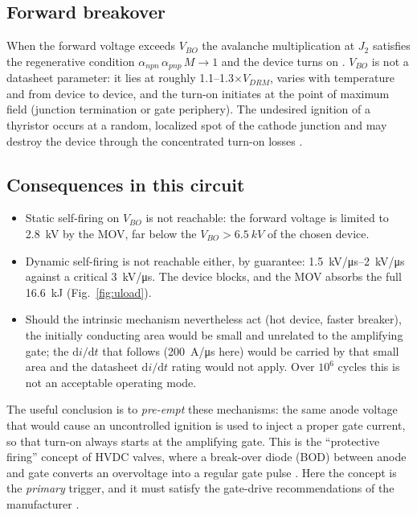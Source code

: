 \documentclass[11pt,a4paper]{article}
\begin{document}
\subsection{Forward breakover}

When the forward voltage exceeds $V_{BO}$ the avalanche multiplication at $J_2$ satisfies the
regenerative condition $\alpha_{npn}\,\alpha_{pnp}\,M \to 1$ and the device turns on
\cite{baliga}. $V_{BO}$ is not a datasheet parameter: it lies at roughly
\numrange{1.1}{1.3}$\times V_{DRM}$, varies with temperature and from device to device, and the
turn-on initiates at the point of maximum field (junction termination or gate periphery). The
undesired ignition of a thyristor occurs at a random, localized spot of the cathode
junction and may destroy the device through the concentrated turn-on losses \cite{bodpatent}.

\subsection{Consequences in this circuit}

\begin{itemize}
\item Static self-firing on $V_{BO}$ is not reachable: the forward voltage is limited to
      \SI{2.8}{kV} by the MOV, far below the $V_{BO} > \SI{6.5}{kV}$ of the chosen
      device.
\item Dynamic self-firing is not reachable either, by guarantee: \SIrange{1.5}{2}{kV/\micro s}
      against a critical \SI{3}{kV/\micro s}. The device blocks, and the MOV absorbs the full
      \SI{16.6}{kJ} (Fig.~\ref{fig:uload}).
\item Should the intrinsic mechanism nevertheless act (hot device, faster breaker), the
      initially conducting area would be small and unrelated to the amplifying gate; the
      $\mathrm{d}i/\mathrm{d}t$ that follows (\SI{200}{A/\micro s} here) would be carried by that
      small area and the datasheet $\mathrm{d}i/\mathrm{d}t$ rating would not apply. Over $10^6$
      cycles this is not an acceptable operating mode.
\end{itemize}

The useful conclusion is to \emph{pre-empt} these mechanisms: the same
anode voltage that would cause an uncontrolled ignition is used to inject a proper gate current,
so that turn-on always starts at the amplifying gate. This is the ``protective firing'' concept of
HVDC valves, where a break-over diode (BOD) between anode and gate converts an overvoltage into a
regular gate pulse \cite{bodpatent,arrillaga}. Here the concept is the \emph{primary} trigger,
and it must satisfy the gate-drive recommendations of the manufacturer \cite{an5sya2034}.
\end{document}
